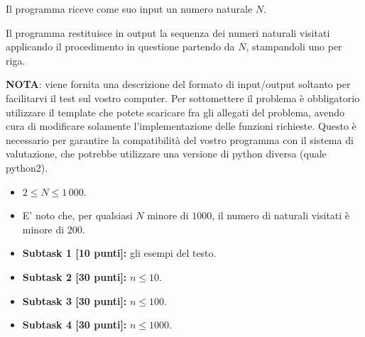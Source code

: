 \InputFile
Il programma riceve come suo input un numero naturale $N$.

\OutputFile
Il programma restituisce in output la sequenza dei numeri naturali visitati applicando 
il procedimento in questione partendo da $N$, stampandoli uno per riga. 

\textbf{NOTA}: viene fornita una descrizione del formato di input/output soltanto 
per facilitarvi il test sul vostro computer. Per sottomettere il problema è obbligatorio 
utilizzare il template che potete scaricare fra gli allegati del problema, avendo 
cura di modificare solamente l'implementazione delle funzioni richieste. Questo 
è necessario per garantire la compatibilità del vostro programma con il sistema 
di valutazione, che potrebbe utilizzare una versione di python diversa (quale python2).

\Examples
\begin{example}
%
%
\end{example}

\Constraints
\begin{itemize}[nolistsep, noitemsep]
\item $2 \le N \le 1\,000 $.
\item E' noto che, per qualsiasi $N$ minore di $1000$, il numero di naturali visitati è minore di $200$.
\end{itemize}

\Scoring
\begin{itemize}
  \item \textbf{Subtask 1 [10 punti]:} gli esempi del testo.
  \item \textbf{Subtask 2 [30 punti]:} $n \leq 10$.
  \item \textbf{Subtask 3 [30 punti]:} $n \leq 100$.
  \item \textbf{Subtask 4 [30 punti]:} $n \leq 1000$.
\end{itemize}
  

